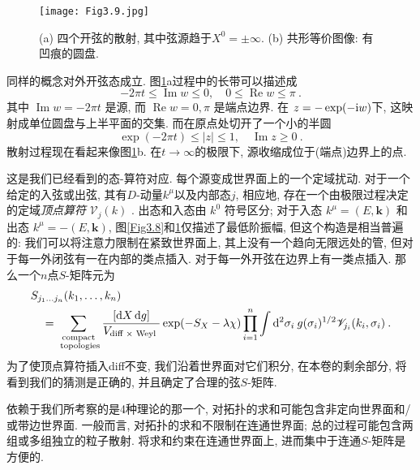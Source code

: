 \begin{figure}[h]
	\begin{center}
		\texttt{[image: Fig3.9.jpg]}\\
		\caption{(a) 四个开弦的散射, 其中弦源趋于$X^{0}=\pm \infty$. (b) 共形等价图像: 有凹痕的圆盘.}\label{Fig3.9}
	\end{center}
\end{figure}

同样的概念对外开弦态成立. 图\ref{Fig3.9}a过程中的长带可以描述成
\begin{equation}
-2 \pi t \leq \operatorname{Im} w \leq 0, \quad 0 \leq \operatorname{Re} w \leq \pi \:. \label{3.5.3}
\end{equation}
其中 $\operatorname{Im} w=-2 \pi t$ 是源, 而 $\operatorname{Re} w=0, \pi$ 是端点边界. 在 $z=-\exp (-\mathrm{i} w)$下, 这映射成单位圆盘与上半平面的交集. 而在原点处切开了一个小的半圆
\begin{equation}
\exp (-2 \pi t) \leq|z| \leq 1, \quad \operatorname{Im} z \geq 0 \:. \label{3.5.4}
\end{equation}
散射过程现在看起来像图\ref{Fig3.9}b. 在$t \rightarrow \infty$的极限下, 源收缩成位于(端点)边界上的点.

这是我们已经看到的态-算符对应. 每个源变成世界面上的一个定域扰动. 对于一个给定的入弦或出弦, 其有$D$-动量$k^{\mu}$以及内部态$j$, 相应地, 存在一个由极限过程决定的定域\emph{顶点算符} $\mathscr{V}_{j}(k)$ . 出态和入态由 $k^{0}$ 符号区分; 对于入态 $k^{\mu}=(E, \mathbf{k})$ 和出态 $k^{\mu}=-(E, \mathbf{k})$, 图\ref{Fig3.8}和\ref{Fig3.9}仅描述了最低阶振幅, 但这个构造是相当普遍的: 我们可以将注意力限制在紧致世界面上, 其上没有一个趋向无限远处的管, 但对于每一外闭弦有一在内部的类点插入. 对于每一外开弦在边界上有一类点插入. 那么一个$n$点$S$-矩阵元为
\begin{align}
&S_{j_{1} \ldots j_{n}}(k_{1}, \ldots, k_{n})  \nonumber \\
&\quad=\sum_{\substack{\text { compact } \\ \text{ topologies}}}\frac{[\mathrm{d} X \, \mathrm{d} g]}{V_{\text {diff } \times \text { Weyl }}} \exp (-S_{X}-\lambda \chi) 
	\prod_{i=1}^{n} \int \mathrm{d}^{2} \sigma_{i} \: g(\sigma_{i})^{1 / 2} \mathscr{V}_{j_{i}}(k_{i}, \sigma_{i}) \:. \label{3.5.5}
\end{align}
为了使顶点算符插入diff不变, 我们沿着世界面对它们积分, 在本卷的剩余部分, 将看到我们的猜测是正确的, 并且确定了合理的弦$S$-矩阵. 

依赖于我们所考察的是4种理论的那一个, 对拓扑的求和可能包含非定向世界面和/或带边世界面. 一般而言, 对拓扑的求和不限制在连通世界面; 总的过程可能包含两组或多组独立的粒子散射. 将求和约束在连通世界面上, 进而集中于连通$S$-矩阵是方便的. 


